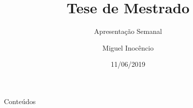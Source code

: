\documentclass{beamer}
\title[Apresentação Semanal]{Tese de Mestrado}
\subtitle{Apresentação Semanal}
\author[M. Inocêncio]{Miguel Inocêncio}
\institute[UA]	{Universidade de Aveiro\\ 
				Instituto de Telecomunicações}
\date{11/06/2019}
\begin{document}
\begin{frame}
	\titlepage
\end{frame}

\begin{frame}{Conteúdos}
	\tableofcontents
\end{frame}

\end{document}
